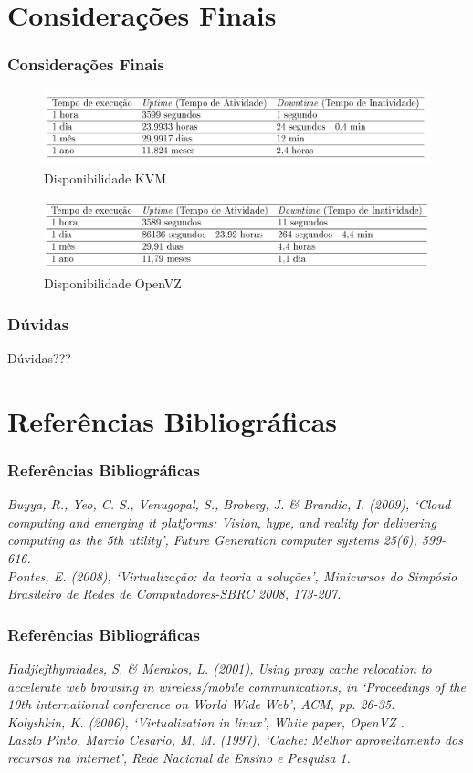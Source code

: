 \documentclass{beamer}
\begin{document}
    \section{Considerações Finais}
    \begin{frame}
     \frametitle{Considerações Finais}
     \begin{figure}
      \centering
      \includegraphics[scale=0.2]{imagens/TableKVM.jpg}
      \caption{Disponibilidade KVM}
     \end{figure}
     
     \begin{figure}
      \centering
      \includegraphics[scale=0.2]{imagens/TableOpenVZ.jpg}
      \caption{Disponibilidade OpenVZ}
     \end{figure}
    \end{frame}
    
    \begin{frame}
     \frametitle{Dúvidas}
     \centering
     \huge{Dúvidas???}
    \end{frame}
    
    \section{Referências Bibliográficas}
    \begin{frame}
     \frametitle{Referências Bibliográficas}
    \textit{Buyya, R., Yeo, C. S., Venugopal, S., Broberg, J. \& Brandic, I. (2009), `Cloud computing and emerging it platforms: Vision, hype, and reality for delivering computing as the 5th utility', Future Generation computer systems 25(6), 599-616.\\}
    \textit{Pontes, E. (2008), `Virtualização: da teoria a soluções', Minicursos do Simpósio Brasileiro de Redes de Computadores-SBRC 2008, 173-207.\\}    
    \end{frame}
    
    \begin{frame}
    \frametitle{Referências Bibliográficas}
     \textit{Hadjiefthymiades, S. \& Merakos, L. (2001), Using proxy cache relocation to accelerate web browsing in wireless/mobile communications, in `Proceedings of the 10th international conference on World Wide Web', ACM, pp. 26-35.\\}
    \textit{Kolyshkin, K. (2006), `Virtualization in linux', White paper, OpenVZ .\\}
    \textit{Laszlo Pinto, Marcio Cesario, M. M. (1997), `Cache: Melhor aproveitamento dos recursos na internet', Rede Nacional de Ensino e Pesquisa 1.}
    \end{frame}
\end{document}
